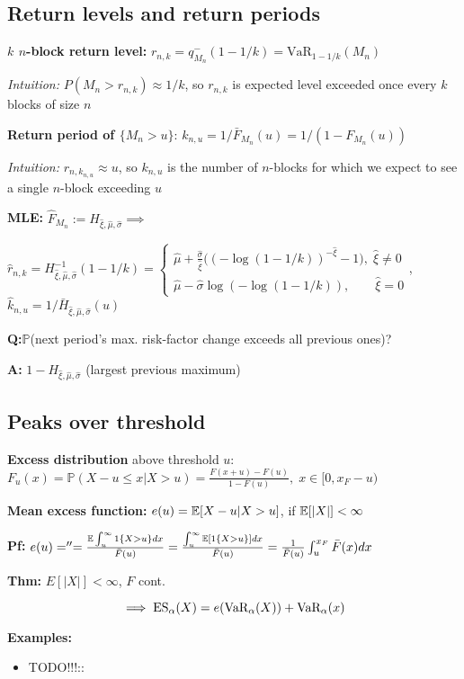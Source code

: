 \subsection*{Return levels and return periods}
\textbf{$k$ $n$-block return level:} $r_{n,k}=q^-_{M_n}(1-1/k)=\text{VaR}_{1-1/k}(M_n)$

\textit{Intuition:} $P(M_n>r_{n,k})\approx1/k$, so $r_{n,k}$ is expected level exceeded once every $k$ blocks of size $n$

\textbf{Return period of $\{M_n>u\}$}: $k_{n,u}=1/\bar F_{M_n}(u)=1/(1-F_{M_n}(u))$


\textit{Intuition:} $r_{n,k_{n,u}} \approx u$,
so $k_{n,u}$ is the number of $n$-blocks for which we expect to see a single $n$-block exceeding $u$

\textbf{MLE:} $\hat F_{M_n} := H_{\hat\xi,\hat\mu,\hat\sigma} \implies$

$\hat r_{n,k} = H^{-1}_{\hat\xi,\hat\mu,\hat\sigma} (1 - 1/k)=
\begin{cases}
\hat\mu + \frac{\hat\sigma}{\hat\xi}\big( (-\log(1-1/k))^{-\hat\xi} -1 \big),\;
\hat\xi\neq 0\\
\hat\mu - \hat\sigma \log(- \log(1 - 1/k)),\quad\quad \hat\xi=0
\end{cases}$,
$\hat k_{n,u} = 1/  \bar H_{\hat\xi,\hat\mu,\hat\sigma} (u)$

\textbf{Q:}$\mathbb{P}$(next period’s max.
risk-factor change exceeds all previous ones)?

\textbf{A:} $1 - H_{\hat\xi,\hat\mu,\hat\sigma}$ (largest previous maximum)

\subsection*{Peaks over threshold}
\textbf{Excess distribution} above threshold $u$:\\
$F_u(x)=\mathbb{P}(X-u\leq x|X>u)=\frac{F(x+u)-F(u)}{1-F(u)},\; x\in[0,x_F-u)$

\textbf{Mean excess function:} $e(u)=\mathbb{E}[X-u|X>u]$, if $\mathbb{E}[|X|]<\infty$

\textbf{Pf:} $e(u)=''=\frac{\mathbb{E}\int^\infty_u 1\{X>u\}dx}{\bar F(u)}=\frac{\int^\infty_u \mathbb{E}[1\{X>u\}]dx}{\bar F(u)}=\frac{1}{\bar F(u)}\int^{x_F}_u \bar F(x) dx$

\textbf{Thm:} $E[|X|]<\infty$, $F$ cont.

\[\implies \text{ES}_\alpha(X)=e(\text{VaR}_\alpha(X))+\text{VaR}_\alpha(x)\]

\textbf{Examples:}
\begin{itemize}
    \item TODO!!!::
\end{itemize}

